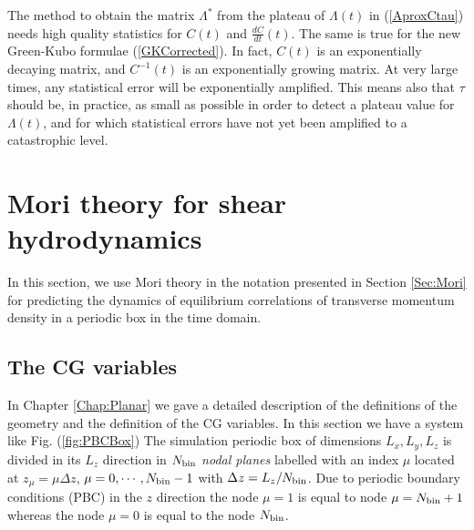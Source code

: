 \documentclass[a4paper,openright,12pt]{book}
\begin{document}
The  method to  obtain  the  matrix $\Lambda^*$  from  the plateau  of
$\Lambda(t)$ in  (\ref{AproxCtau}) needs  high quality  statistics for
$C(t)$  and  $\frac{dC}{dt}(t)$.   The  same   is  true  for  the  new
Green-Kubo  formulae (\ref{GKCorrected}).   In  fact,  ${C}(t)$ is  an
exponentially  decaying matrix,  and $C^{-1}(t)$  is an  exponentially
growing matrix.   At very large  times, any statistical error  will be
exponentially amplified.  This  means also that $\tau$  should be, in
practice, as small as possible in  order to detect a plateau value for
$\Lambda(t)$,  and for  which  statistical errors  have  not yet  been
amplified to a  catastrophic level.  


\section{Mori theory for shear hydrodynamics}
\label{Sec:MoriShearHydro}
In this section, we use Mori theory in the notation presented in Section \ref{Sec:Mori} for predicting the dynamics of equilibrium correlations of transverse momentum density in a periodic box in the time domain. 
\subsection{The CG variables}
In Chapter \ref{Chap:Planar} we gave a detailed description of the definitions of the geometry and the definition of the CG variables. In this section we have a system like Fig. (\ref{fig:PBCBox})
The simulation periodic box of  dimensions $L_x,L_y,L_z$ is divided in
its $L_z$  direction in  $N_{\rm bin}$ \textit{nodal  planes} labelled
with   an    index   $\mu$   located   at    $z_\mu=\mu   \Delta   z$,
$\mu=0,\cdots,N_{\rm bin}-1$ with $\Delta  z=L_z/N_{\rm bin}$.  Due to
periodic  boundary conditions  (PBC)  in the  $z$  direction the  node
$\mu=1$ is equal to node  $\mu=N_{\rm bin}+1$ whereas the node $\mu=0$
is equal to the node  $N_{\rm bin}$.  
\end{document}
